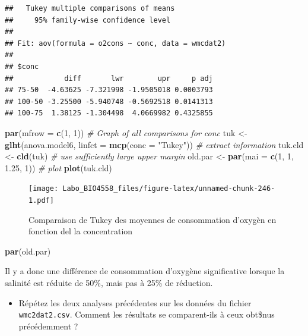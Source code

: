 \documentclass[
  12pt,
]{book}
\newenvironment{Shaded}{\begin{snugshade}}{\end{snugshade}}
\newcommand{\CommentTok}[1]{\textcolor[rgb]{0.56,0.35,0.01}{\textit{#1}}}
\newcommand{\DataTypeTok}[1]{\textcolor[rgb]{0.13,0.29,0.53}{#1}}
\newcommand{\DecValTok}[1]{\textcolor[rgb]{0.00,0.00,0.81}{#1}}
\newcommand{\FloatTok}[1]{\textcolor[rgb]{0.00,0.00,0.81}{#1}}
\newcommand{\KeywordTok}[1]{\textcolor[rgb]{0.13,0.29,0.53}{\textbf{#1}}}
\newcommand{\NormalTok}[1]{#1}
\newcommand{\StringTok}[1]{\textcolor[rgb]{0.31,0.60,0.02}{#1}}
\providecommand{\tightlist}{%
  \setlength{\itemsep}{0pt}\setlength{\parskip}{0pt}}
\begin{document}
\begin{verbatim}
##   Tukey multiple comparisons of means
##     95% family-wise confidence level
## 
## Fit: aov(formula = o2cons ~ conc, data = wmcdat2)
## 
## $conc
##            diff       lwr        upr     p adj
## 75-50  -4.63625 -7.321998 -1.9505018 0.0003793
## 100-50 -3.25500 -5.940748 -0.5692518 0.0141313
## 100-75  1.38125 -1.304498  4.0669982 0.4325855
\end{verbatim}

\begin{Shaded}
\begin{Highlighting}[]
\KeywordTok{par}\NormalTok{(}\DataTypeTok{mfrow =} \KeywordTok{c}\NormalTok{(}\DecValTok{1}\NormalTok{, }\DecValTok{1}\NormalTok{))}
\CommentTok{\# Graph of all comparisons for conc}
\NormalTok{tuk \textless{}{-}}\StringTok{ }\KeywordTok{glht}\NormalTok{(anova.model6, }\DataTypeTok{linfct =} \KeywordTok{mcp}\NormalTok{(}\DataTypeTok{conc =} \StringTok{"Tukey"}\NormalTok{))}
\CommentTok{\# extract information}
\NormalTok{tuk.cld \textless{}{-}}\StringTok{ }\KeywordTok{cld}\NormalTok{(tuk)}
\CommentTok{\# use sufficiently large upper margin}
\NormalTok{old.par \textless{}{-}}\StringTok{ }\KeywordTok{par}\NormalTok{(}\DataTypeTok{mai =} \KeywordTok{c}\NormalTok{(}\DecValTok{1}\NormalTok{, }\DecValTok{1}\NormalTok{, }\FloatTok{1.25}\NormalTok{, }\DecValTok{1}\NormalTok{))}
\CommentTok{\# plot}
\KeywordTok{plot}\NormalTok{(tuk.cld)}
\end{Highlighting}
\end{Shaded}

\begin{figure}
\centering
\texttt{[image: Labo\_BIO4558\_files/figure-latex/unnamed-chunk-246-1.pdf]}
\caption{\label{fig:unnamed-chunk-246}Comparaison de Tukey des moyennes de consommation d'oxygèn en fonction del la concentration}
\end{figure}

\begin{Shaded}
\begin{Highlighting}[]
\KeywordTok{par}\NormalTok{(old.par)}
\end{Highlighting}
\end{Shaded}

Il y a donc une différence de consommation d'oxygène significative lorsque la salinité est réduite de 50\%, mais pas à 25\% de réduction.

\begin{itemize}
\tightlist
\item
  Répétez les deux analyses précédentes sur les données du fichier \texttt{wmc2dat2.csv}. Comment les résultats se comparent-ils à ceux obt\$nus précédemment ?
\end{itemize}
\end{document}
